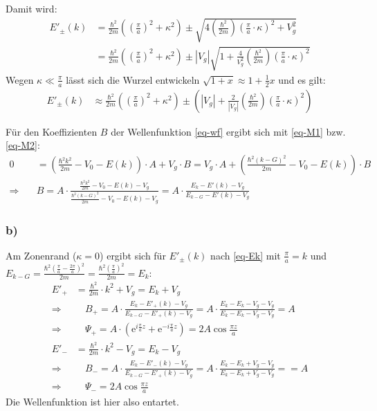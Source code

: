 Damit wird:
\begin{align}
\nonumber
  E'_\pm(k) &=\frac{\hbar^2}{2 m}\left(\left(\frac{\pi}{a}\right)^2 + \kappa^2\right)
  \pm \sqrt{4 \left(\frac{\hbar^2}{2 m}\right) \left(\frac{\pi}{a}\cdot \kappa \right)^2 + V_g^2}\\
\label{eq-Ek}
  & = \frac{\hbar^2}{2 m}\left(\left(\frac{\pi}{a}\right)^2 + \kappa^2\right)
  \pm |V_g|\sqrt{1 + \frac{4}{V_g^2}\left(\frac{\hbar^2}{2 m}\right) \left(\frac{\pi}{a}\cdot \kappa \right)^2 }
\end{align}
Wegen $\kappa \ll \frac{\pi}{a}$ lässt sich die Wurzel entwickeln
$\sqrt{1 + x} \approx 1 + \frac{1}{2}x$ und es gilt:
\begin{align}
  E'_\pm(k) &\approx \frac{\hbar^2}{2 m}\left(\left(\frac{\pi}{a}\right)^2 + \kappa^2\right)
  \pm  \left(|V_g| + \frac{2}{|V_g|}\left(\frac{\hbar^2}{2 m}\right) \left(\frac{\pi}{a}\cdot \kappa \right)^2 \right)
\end{align}

Für den Koeffizienten $B$ der Wellenfunktion \eqref{eq-wf} ergibt sich mit \eqref{eq-M1} bzw. \eqref{eq-M2}:
\begin{align}
\nonumber
0 &= \left(\frac{\hbar^2k^2}{2m}-V_0-E(k)\right)\cdot  A + V_g \cdot B =
V_g \cdot A + \left(\frac{\hbar^2(k-G)^2}{2m}-V_0-E(k)\right) \cdot B \\
\Rightarrow \quad & B = A \cdot \frac{\frac{\hbar^2k^2}{2m}-V_0-E(k)-V_g}
   {\frac{\hbar^2(k-G)^2}{2m}-V_0-E(k)-V_g}
= A \cdot \frac{E_k - E'(k)-V_g}{E_{k-G} - E'(k)-V_g}
\end{align}

\subsubsection*{b)}
Am Zonenrand ($\kappa = 0$) ergibt sich für $E'_\pm(k)$ nach \eqref{eq-Ek}
mit $\frac{\pi}{a} = k$ und $E_{k-G} = \frac{\hbar^2(\frac{\pi}{a}-\frac{2\pi}{a})^2}{2m} = \frac{\hbar^2(\frac{\pi}{a})^2}{2m} = E_k$:
\begin{align*}
  E'_+ &= \frac{\hbar^2}{2 m} \cdot k^2 + V_g  = E_k + V_g \\
\Rightarrow & \quad  B_+ = A \cdot \frac{E_k - E'_+(k) - V_g}{E_{k-G}  - E'_+(k) - V_g} =
  A \cdot \frac{E_k - E_k - V_g - V_g}{E_{k}  - E_k - V_g - V_g} =
  A \\
\Rightarrow & \quad  \Psi_+ = A \cdot \left(\mathrm e^{i \frac{\pi}{a} z}
  + \mathrm e^{-i \frac{\pi}{a} z}  \right) =2A\cos{\frac{\pi z}{a}}\\
  E'_- &= \frac{\hbar^2}{2 m} \cdot k^2 - V_g = E_k - V_g \\
\Rightarrow & \quad  B_- = A \cdot \frac{E_k - E'_-(k) - V_g}{E_{k-G}  - E'_+(k) - V_g} =
  A \cdot \frac{E_k - E_k + V_g - V_g}{E_{k}  - E_k + V_g - V_g} =
  = A \\
\Rightarrow & \quad  \Psi_- = 2A\cos{\frac{\pi z}{a}}
\end{align*}
Die Wellenfunktion ist hier also entartet.

